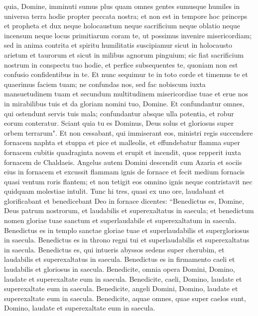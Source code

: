 \begin{biblechapter}
\verse quia, Domine, imminuti sumus plus quam omnes gentes sumusque humiles in universa terra hodie propter peccata nostra; 
\verse et non est in tempore hoc princeps et propheta et dux neque holocaustum neque sacrificium neque oblatio neque incensum neque locus primitiarum coram te, ut possimus invenire misericordiam; 
\verse sed in anima contrita et spiritu humilitatis suscipiamur sicut in holocausto arietum et taurorum 
\verse et sicut in milibus agnorum pinguium; sic fiat sacrificium nostrum in conspectu tuo hodie, et perfice subsequentes te, quoniam non est confusio confidentibus in te. 
\verse Et nunc sequimur te in toto corde et timemus te et quaerimus faciem tuam; 
\verse ne confundas nos, sed fac nobiscum iuxta mansuetudinem tuam et secundum multitudinem misericordiae tuae 
\verse et erue nos in mirabilibus tuis et da gloriam nomini tuo, Domine. 
\verse Et confundantur omnes, qui ostendunt servis tuis mala; confundantur absque ulla potentia, et robur eorum conteratur. 
\verse Sciant quia tu es Dominus, Deus solus et gloriosus super orbem terrarum". 
\verse Et non cessabant, qui immiserant eos, ministri regis succendere fornacem naphta et stuppa et pice et malleolis, 
\verse et effundebatur flamma super fornacem cubitis quadraginta novem 
\verse et erupit et incendit, quos repperit iuxta fornacem de Chaldaeis. 
\verse Angelus autem Domini descendit cum Azaria et sociis eius in fornacem et excussit flammam ignis de fornace 
\verse et fecit medium fornacis quasi ventum roris flantem; et non tetigit eos omnino ignis neque contristavit nec quidquam molestiae intulit. 
\verse Tunc hi tres, quasi ex uno ore, laudabant et glorificabant et benedicebant Deo in fornace dicentes: 
\verse “Benedictus es, Domine, Deus patrum nostrorum, et laudabilis et superexaltatus in saecula; et benedictum nomen gloriae tuae sanctum et superlaudabile et superexaltatum in saecula. 
\verse Benedictus es in templo sanctae gloriae tuae et superlaudabilis et supergloriosus in saecula. 
\verse Benedictus es in throno regni tui et superlaudabilis et superexaltatus in saecula. 
\verse Benedictus es, qui intueris abyssos sedens super cherubim, et laudabilis et superexaltatus in saecula. 
\verse Benedictus es in firmamento caeli et laudabilis et gloriosus in saecula. 
\verse Benedicite, omnia opera Domini, Domino, laudate et superexaltate eum in saecula. 
\verse Benedicite, caeli, Domino, laudate et superexaltate eum in saecula. 
\verse Benedicite, angeli Domini, Domino, laudate et superexaltate eum in saecula. 
\verse Benedicite, aquae omnes, quae super caelos sunt, Domino, laudate et superexaltate eum in saecula. 

\end{biblechapter}
